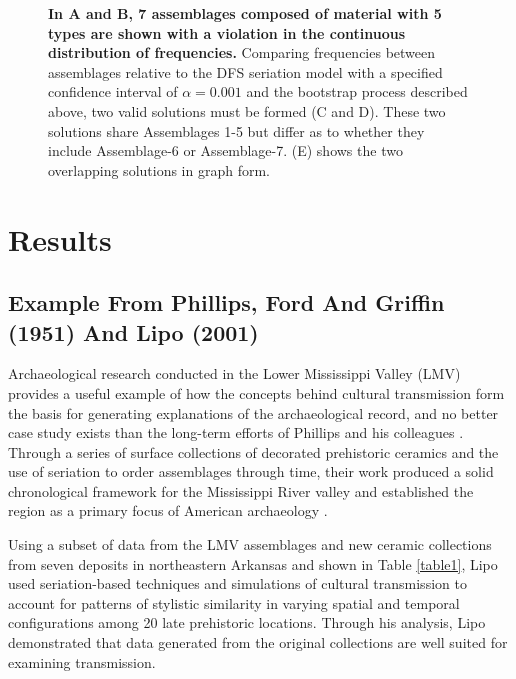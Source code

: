 \documentclass[10pt,letterpaper]{article}
\begin{document}
\begin{figure}[h]
\caption{{\bf In A and B, 7 assemblages composed of material with 5 types are shown with a violation in the continuous distribution of frequencies.} Comparing frequencies between assemblages relative to the DFS seriation model with a specified confidence interval of $\alpha = 0.001$ and the bootstrap process described above, two valid solutions must be formed (C and D). These two solutions share Assemblages 1-5 but differ as to whether they include Assemblage-6 or Assemblage-7. (E) shows the two overlapping solutions in graph form. }
\label{fig8}
\end{figure}

\section*{Results}

\subsection*{Example From Phillips, Ford And Griffin (1951) And Lipo (2001)}

Archaeological research conducted in the Lower Mississippi Valley (LMV) provides a useful example of how the concepts behind cultural transmission form the basis for generating explanations of the archaeological record, and no better case study exists than the long-term efforts of Phillips and his colleagues \cite{Phillips1951}. Through a series of surface collections of decorated prehistoric ceramics and the use of seriation to order assemblages through time, their work produced a solid chronological framework for the Mississippi River valley and established the region as a primary focus of American archaeology \cite{lyman1997rise,o1998james,o1998brief}. 

Using a subset of data from the LMV assemblages and new ceramic collections from seven deposits in northeastern Arkansas \cite{Lipo1997Population,Lipo2001a} and shown in Table \ref{table1}, Lipo used seriation-based techniques and simulations of cultural transmission to account for patterns of stylistic similarity in varying spatial and temporal configurations among 20 late prehistoric locations. Through his analysis, Lipo \cite{Lipo2001a,Lipo2008} demonstrated that data generated from the original collections are well suited for examining transmission. 
\end{document}

